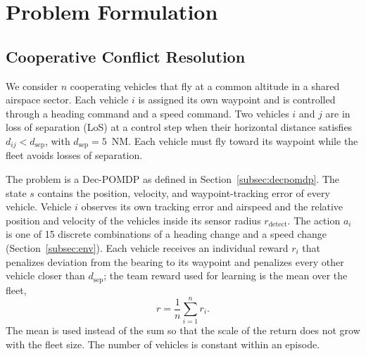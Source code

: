 \section{Problem Formulation}
\label{sec:problem}
\subsection{Cooperative Conflict Resolution}
\label{subsec:problem}
We consider $n$ cooperating vehicles that fly at a common altitude in a shared airspace
sector. Each vehicle $i$ is assigned its own waypoint and is controlled through a heading
command and a speed command. Two vehicles $i$ and $j$ are in loss of separation (LoS) at a
control step when their horizontal distance satisfies $d_{ij} < d_{\text{sep}}$, with
$d_{\text{sep}} = 5$~NM. Each vehicle must fly toward its waypoint while the fleet avoids
losses of separation.

The problem is a Dec-POMDP as defined in Section~\ref{subsec:decpomdp}. The state $s$
contains the position, velocity, and waypoint-tracking error of every vehicle. Vehicle $i$
observes its own tracking error and airspeed and the relative position and velocity of the
vehicles inside its sensor radius $r_{\text{detect}}$. The action $a_i$ is one of 15
discrete combinations of a heading change and a speed change
(Section~\ref{subsec:env}). Each vehicle receives an individual reward $r_i$ that penalizes
deviation from the bearing to its waypoint and penalizes every other vehicle closer than
$d_{\text{sep}}$; the team reward used for learning is the mean over the fleet,
\begin{equation}
\label{eq:team-reward}
r = \frac{1}{n}\sum_{i=1}^{n} r_i .
\end{equation}
The mean is used instead of the sum so that the scale of the return does not grow with the
fleet size. The number of vehicles is constant within an episode.

